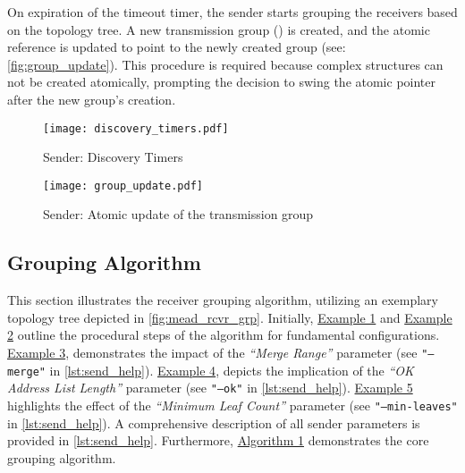 On expiration of the timeout timer, the sender starts grouping the receivers
    based on the topology tree.
A new transmission group () is created, and the atomic
    reference is updated to point to the newly created group (see:
    \autoref{fig:group_update}).
This procedure is required because complex structures can not be created
    atomically, prompting the decision to swing the atomic pointer after the
    new group's creation.


\begin{figure}
    \begin{center}
        \texttt{[image: discovery\_timers.pdf]}
    \end{center}
    \caption{Sender: Discovery Timers}
    \label{fig:discovery_timers}
\end{figure}

\begin{figure}
    \begin{center}
        \texttt{[image: group\_update.pdf]}
    \end{center}
    \caption{Sender: Atomic update of the transmission group}
    \label{fig:group_update}
\end{figure}

\subsection{Grouping Algorithm} %
\label{sub:Grouping}
This section illustrates the receiver grouping algorithm, utilizing an exemplary
    topology tree depicted in \autoref{fig:mead_rcvr_grp}.
Initially, \hyperref[sec:Max 5]{Example 1} and \hyperref[sec:Max 10]{Example 2}
    outline the procedural steps of the algorithm for fundamental configurations.
\hyperref[sec:Max 10 Merge 1]{Example 3}, demonstrates the impact of the \textit{``Merge
    Range''} parameter (see \texttt{"--merge"} in \autoref{lst:send_help}).
\hyperref[sec:Max 12 Ok 7]{Example 4}, depicts the implication of the \textit{``OK Address
    List Length''} parameter (see \texttt{"--ok"} in \autoref{lst:send_help}).
\hyperref[sec:Max 10 Min Leaf 3]{Example 5} highlights the effect of the \textit{``Minimum
    Leaf Count''} parameter (see \texttt{"--min-leaves"} in \autoref{lst:send_help}).
A comprehensive description of all sender parameters is provided in \autoref{lst:send_help}.
Furthermore, \hyperref[alg:sender_grouping]{Algorithm 1} demonstrates the core grouping
    algorithm.


